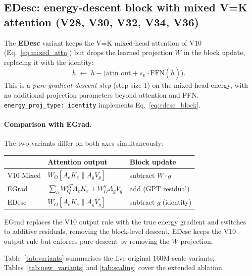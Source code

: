 \documentclass[11pt,a4paper]{article}
\begin{document}
\subsection{EDesc: energy-descent block with mixed V=K attention (V28, V30, V32, V34, V36)}
\label{sec:edesc}

The \textbf{EDesc} variant keeps the V=K mixed-head attention of V10
(Eq.~\ref{eq:mixed_attn}) but drops the learned projection $W$ in the block update,
replacing it with the identity:
\begin{equation}
  h \;\leftarrow\; h - \bigl(\mathrm{attn\_out} + s_{\mathrm{ff}}\cdot\mathrm{FFN}(\tilde{h})\bigr).
  \label{eq:edesc_block}
\end{equation}
This is a \emph{pure gradient descent step} (step size 1) on the mixed-head energy,
with no additional projection parameters beyond attention and FFN.
\texttt{energy\_proj\_type: identity} implements Eq.~\ref{eq:edesc_block}.

\paragraph{Comparison with EGrad.}
The two variants differ on both axes simultaneously:

\begin{center}
\begin{tabular}{lll}
\toprule
 & \textbf{Attention output} & \textbf{Block update} \\
\midrule
V10 Mixed & $W_O[A_e K_e \| A_g V_g]$ & subtract $W \cdot g$ \\
EGrad & $\sum_h W_Q^{eT} A_e K_e + W_O^g A_g V_g$ & add (GPT residual) \\
EDesc & $W_O[A_e K_e \| A_g V_g]$ & subtract $g$ (identity) \\
\bottomrule
\end{tabular}
\end{center}

EGrad replaces the V10 output rule with the true energy gradient and switches to additive
residuals, removing the block-level descent.
EDesc keeps the V10 output rule but enforces pure descent by removing the $W$ projection.

Table~\ref{tab:variants} summarises the five original 160M-scale variants;
Tables~\ref{tab:new_variants} and \ref{tab:scaling} cover the extended ablation.
\end{document}
